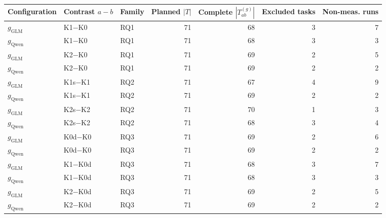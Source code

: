 \begin{tabular}{@{}lllrrrr@{}}
  \toprule
  Configuration & Contrast $a-b$ & Family & Planned $|T|$ & Complete $|T^{(g)}_{ab}|$ & Excluded tasks & Non-meas. runs \\
  \midrule
  $g_{\mathrm{GLM}}$ & K1$-$K0 & RQ1 & 71 & 68 & 3 & 7 \\
  \rowcolor{black!6} $g_{\mathrm{Qwen}}$ & K1$-$K0 & RQ1 & 71 & 68 & 3 & 3 \\
  $g_{\mathrm{GLM}}$ & K2$-$K0 & RQ1 & 71 & 69 & 2 & 5 \\
  \rowcolor{black!6} $g_{\mathrm{Qwen}}$ & K2$-$K0 & RQ1 & 71 & 69 & 2 & 2 \\
  $g_{\mathrm{GLM}}$ & K1s$-$K1 & RQ2 & 71 & 67 & 4 & 9 \\
  \rowcolor{black!6} $g_{\mathrm{Qwen}}$ & K1s$-$K1 & RQ2 & 71 & 69 & 2 & 2 \\
  $g_{\mathrm{GLM}}$ & K2s$-$K2 & RQ2 & 71 & 70 & 1 & 3 \\
  \rowcolor{black!6} $g_{\mathrm{Qwen}}$ & K2s$-$K2 & RQ2 & 71 & 68 & 3 & 4 \\
  $g_{\mathrm{GLM}}$ & K0d$-$K0 & RQ3 & 71 & 69 & 2 & 6 \\
  \rowcolor{black!6} $g_{\mathrm{Qwen}}$ & K0d$-$K0 & RQ3 & 71 & 69 & 2 & 2 \\
  $g_{\mathrm{GLM}}$ & K1$-$K0d & RQ3 & 71 & 68 & 3 & 7 \\
  \rowcolor{black!6} $g_{\mathrm{Qwen}}$ & K1$-$K0d & RQ3 & 71 & 68 & 3 & 3 \\
  $g_{\mathrm{GLM}}$ & K2$-$K0d & RQ3 & 71 & 69 & 2 & 5 \\
  \rowcolor{black!6} $g_{\mathrm{Qwen}}$ & K2$-$K0d & RQ3 & 71 & 69 & 2 & 2 \\
  \bottomrule
\end{tabular}
